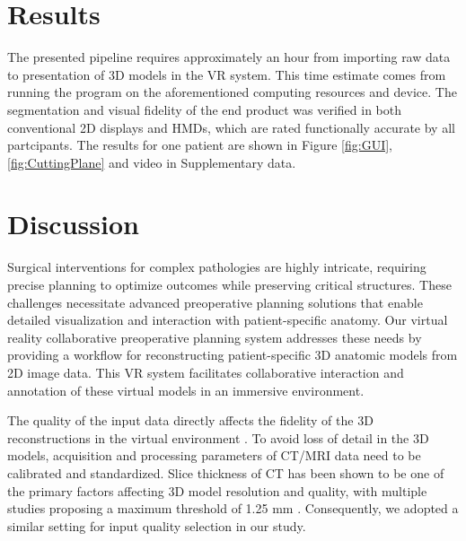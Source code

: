 \documentclass{bmcart}
\begin{document}
\section{Results}
The presented pipeline requires approximately an hour from importing raw data to presentation of 3D models in the VR system. This time estimate comes from running the program on the aforementioned computing resources and device. 
The segmentation and visual fidelity of the end product was verified in both conventional 2D displays and HMDs, which are rated functionally accurate by all partcipants. The results for one patient are shown in Figure \ref{fig:GUI}, \ref{fig:CuttingPlane} and video in Supplementary data. 
\section{Discussion}
Surgical interventions for complex pathologies are highly intricate, requiring precise planning to optimize outcomes while preserving critical structures. These challenges necessitate advanced preoperative planning solutions that enable detailed visualization and interaction with patient-specific anatomy. Our virtual reality collaborative preoperative planning system addresses these needs by providing a workflow for reconstructing patient-specific 3D anatomic models from 2D image data. This VR system facilitates collaborative interaction and annotation of these virtual models in an immersive environment.

The quality of the input data directly affects the fidelity of the 3D reconstructions in the virtual environment \cite{RN7, RN45}. To avoid loss of detail in the 3D models, acquisition and processing parameters of CT/MRI data need to be calibrated and standardized. Slice thickness of CT has been shown to be one of the primary factors affecting 3D model resolution and quality, with multiple studies proposing a maximum threshold of 1.25 mm \cite{RN7, RN47}. Consequently, we adopted a similar setting for input quality selection in our study.
\end{document}
